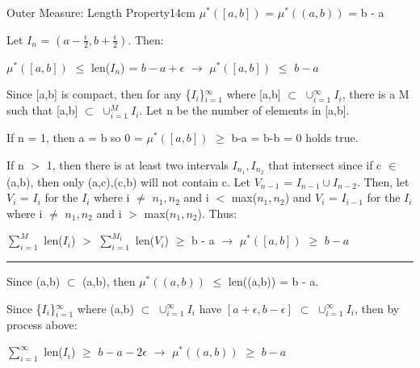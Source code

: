     \begin{wtheorem}{Outer Measure: Length Property}{14cm}
        $\mu^*([a,b])$ = $\mu^*((a,b))$ = b - a
    \end{wtheorem}

    \begin{tbox}
        Let $I_n$ = $(a-\frac{\epsilon}{2} , b+\frac{\epsilon}{2})$. Then:

        \hspace{0.5cm}
        $\mu^*([a,b])$
        $\leq$ len($I_n$)
        = $b - a + \epsilon$
        \hspace{1cm}
        $\rightarrow$
        \hspace{1cm}
        $\mu^*([a,b])$
        $\leq$ $b - a$

        Since [a,b] is compact, then for any \{$I_i$\}$_{i=1}^{\infty}$
        where [a,b] $\subset$ $\cup_{i=1}^{\infty} I_i$, there is a M
        such that [a,b] $\subset$ $\cup_{i=1}^M I_i$.
        Let n be the number of elements in [a,b].

        If n = 1, then a = b so 0 = $\mu^*([a,b])$ $\geq$ b-a = b-b = 0
        holds true.

        If n $>$ 1, then there is at least two intervals $I_{n_1},I_{n_2}$
        that intersect since if c $\in$ (a,b), then only (a,c),(c,b) will
        not contain c.
        Let $V_{n-1}$ = $I_{n-1} \cup I_{n-2}$.
        Then, let $V_i$ = $I_i$ for the $I_i$ where i $\not =$ $n_1,n_2$
        and i $<$ max($n_1,n_2$) and $V_i$ = $I_{i-1}$ for the $I_i$
        where i $\not =$ $n_1,n_2$ and i $>$ max($n_1,n_2$). Thus:

        \hspace{0.5cm}
        $\sum_{i=1}^M$ len($I_i$)
        $>$ $\sum_{i=1}^{M_1}$ len($V_i$)
        $\geq$ b - a
        \hspace{1cm}
        $\rightarrow$
        \hspace{1cm}
        $\mu^*([a,b])$
        $\geq$ $b - a$

        \rule[0.1cm]{15.2cm}{0.01cm}

        Since (a,b) $\subset$ (a,b), then
        $\mu^*((a,b))$ $\leq$ len((a,b)) = b - a.

        Since \{$I_i$\}$_{i=1}^{\infty}$ where (a,b)
        $\subset$ $\cup_{i=1}^{\infty} I_i$ have
        $[a+\epsilon,b-\epsilon]$ $\subset$ $\cup_{i=1}^{\infty} I_i$, then
        by process above:

        \hspace{0.5cm}
        $\sum_{i=1}^{\infty}$ len($I_i$)
        $\geq$ $b - a - 2\epsilon$
        \hspace{1cm}
        $\rightarrow$
        \hspace{1cm}
        $\mu^*((a,b))$
        $\geq$ $b - a$
    \end{tbox}

